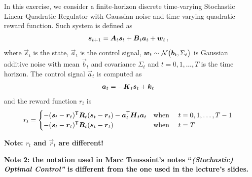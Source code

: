 In this exercise, we consider a finite-horizon discrete time-varying Stochastic Linear Quadratic Regulator with Gaussian noise and time-varying quadratic reward function. Such system is defined as
%
\begin{align}
	{\boldsymbol{s}}_{t+1} = {\boldsymbol{A}}_t {\boldsymbol{s}}_t + {\boldsymbol{B}}_t {\boldsymbol{a}}_t + {\boldsymbol{w}}_t\,, 
\end{align}
where $\vec s_t$ is the state, $\vec a_t$ is the control signal, ${\boldsymbol{w}}_t \sim \mathcal{N}\big({\boldsymbol{b}}_t,\Sigma_t\big)$ is Gaussian additive noise with mean $\vec b_t$ and covariance $\Sigma_t$ and $t=0,1,\dots,T$ is the time horizon. 
The control signal $\vec a_t$ is computed as
%
\begin{align}
	{\boldsymbol{a}}_t = - {\boldsymbol{K}}_t {\boldsymbol{s}}_t + {\boldsymbol{k}}_t
\end{align}
%
and the reward function $r_t$ is
%
\begin{align}
	r_t = \begin{cases}
	- ({\boldsymbol{s}}_t - {\boldsymbol{r}}_t)^\mathsf{T} {\boldsymbol{R}}_t ({\boldsymbol{s}}_t - {\boldsymbol{r}}_t) - {\boldsymbol{a}}^\mathsf{T}_t {\boldsymbol{H}}_t {\boldsymbol{a}}_t  & \text{when \quad} t=0,1,\dots,T-1
	\\
	- ({\boldsymbol{s}}_t - {\boldsymbol{r}}_t)^\mathsf{T} {\boldsymbol{R}}_t ({\boldsymbol{s}}_t - {\boldsymbol{r}}_t) & \text{when \quad} t=T
	\end{cases}
\end{align}
	
\textbf{Note: $r_t$ and $\vec r_t$ are different!}

\textbf{Note 2: the notation used in Marc Toussaint's notes ``\textit{(Stochastic) Optimal Control''} is different from the one used in the lecture's slides.}	
	
